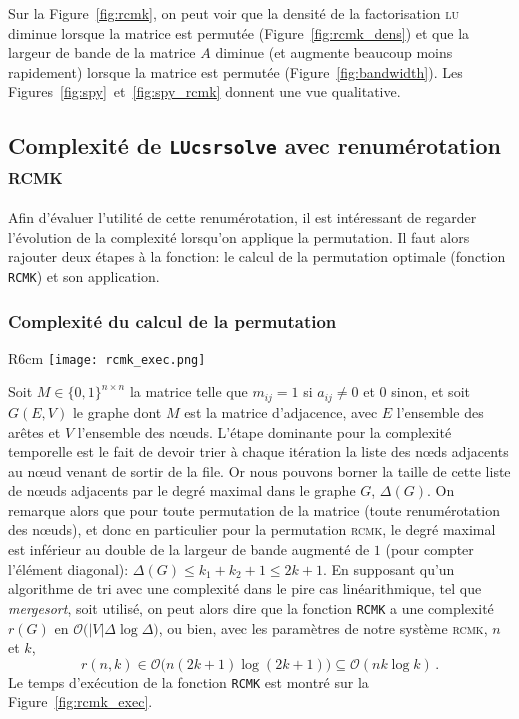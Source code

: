 \documentclass[11pt]{article}
\begin{document}
Sur la Figure~\ref{fig:rcmk}, on peut voir que la densité de la factorisation \textsc{lu} diminue lorsque la matrice est permutée (Figure~\ref{fig:rcmk_dens}) et que la largeur de bande de la matrice $A$ diminue (et augmente beaucoup moins rapidement) lorsque la matrice est permutée (Figure~\ref{fig:bandwidth}).
Les Figures~\ref{fig:spy}~et~\ref{fig:spy_rcmk} donnent une vue qualitative.


\subsection{Complexité de \texttt{LUcsrsolve} avec renumérotation \textsc{rcmk}}
Afin d'évaluer l'utilité de cette renumérotation, il est intéressant de regarder l'évolution de la complexité lorsqu'on applique la permutation. Il faut alors rajouter deux étapes à la fonction: le calcul de la permutation optimale (fonction \lstinline|RCMK|) et son application.
\subsubsection{Complexité du calcul de la permutation}
\begin{wrapfigure}{R}{6cm}
	\centering
	\texttt{[image: rcmk\_exec.png]}
	\caption{Temps d'exécution pour le calcul de la permutation \textsc{rcmk}.}
	\label{fig:rcmk_exec}
\end{wrapfigure}
Soit $M \in \{0, 1\}^{n \times n}$ la matrice telle que $m_{ij} = 1$ si $a_{ij} \ne 0$ et $0$ sinon, et soit $G(E, V)$ le graphe dont $M$ est la matrice d'adjacence, avec $E$ l'ensemble des arêtes et $V$ l'ensemble des n\oe{}uds.
L'étape dominante pour la complexité temporelle est le fait de devoir trier à chaque itération la liste des n\oe{}ds adjacents au n\oe{}ud venant de sortir de la file.
Or nous pouvons borner la taille de cette liste de n\oe{}uds adjacents par le degré maximal dans le graphe $G$, $\Delta(G)$.
On remarque alors que pour toute permutation de la matrice (toute renumérotation des n\oe{}uds), et donc en particulier pour la permutation \textsc{rcmk}, le degré maximal est inférieur au double de la largeur de bande augmenté de $1$ (pour compter l'élément diagonal): $\Delta(G) \le k_1 + k_2 + 1 \le 2k + 1$.
En supposant qu'un algorithme de tri avec une complexité dans le pire cas linéarithmique, tel que \emph{mergesort}, soit utilisé, on peut alors dire que la fonction \lstinline|RCMK| a une complexité $r(G)$ en $\mathcal{O}\big(|V| \Delta \log \Delta \big)$, ou bien, avec les paramètres de notre système \textsc{rcmk}, $n$ et $k$, 
\[
r(n, k) \in \mathcal{O}\big(n (2k+1) \log(2k+1)\big) \subseteq \mathcal{O}(nk \log k)\,.
\]
Le temps d'exécution de la fonction \lstinline|RCMK| est montré sur la Figure~\ref{fig:rcmk_exec}.
\end{document}
